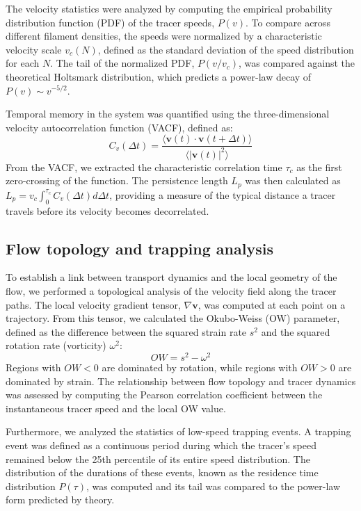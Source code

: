 \documentclass[]{article}
\begin{document}
The velocity statistics were analyzed by computing the empirical probability distribution function (PDF) of the tracer speeds, $P(v)$. To compare across different filament densities, the speeds were normalized by a characteristic velocity scale $v_c(N)$, defined as the standard deviation of the speed distribution for each $N$. The tail of the normalized PDF, $P(v/v_c)$, was compared against the theoretical Holtsmark distribution, which predicts a power-law decay of $P(v) \sim v^{-5/2}$.

Temporal memory in the system was quantified using the three-dimensional velocity autocorrelation function (VACF), defined as:
\begin{equation}
C_v(\Delta t) = \frac{\langle \mathbf{v}(t) \cdot \mathbf{v}(t + \Delta t) \rangle}{\langle |\mathbf{v}(t)|^2 \rangle}
\end{equation}
From the VACF, we extracted the characteristic correlation time $\tau_c$ as the first zero-crossing of the function. The persistence length $L_p$ was then calculated as $L_p = v_c \int_0^{\tau_c} C_v(\Delta t) d\Delta t$, providing a measure of the typical distance a tracer travels before its velocity becomes decorrelated.

\subsection{Flow topology and trapping analysis}
To establish a link between transport dynamics and the local geometry of the flow, we performed a topological analysis of the velocity field along the tracer paths. The local velocity gradient tensor, $\nabla \mathbf{v}$, was computed at each point on a trajectory. From this tensor, we calculated the Okubo-Weiss (OW) parameter, defined as the difference between the squared strain rate $s^2$ and the squared rotation rate (vorticity) $\omega^2$:
\begin{equation}
OW = s^2 - \omega^2
\end{equation}
Regions with $OW < 0$ are dominated by rotation, while regions with $OW > 0$ are dominated by strain. The relationship between flow topology and tracer dynamics was assessed by computing the Pearson correlation coefficient between the instantaneous tracer speed and the local OW value.

Furthermore, we analyzed the statistics of low-speed trapping events. A trapping event was defined as a continuous period during which the tracer's speed remained below the 25th percentile of its entire speed distribution. The distribution of the durations of these events, known as the residence time distribution $P(\tau)$, was computed and its tail was compared to the power-law form predicted by theory.
\end{document}
